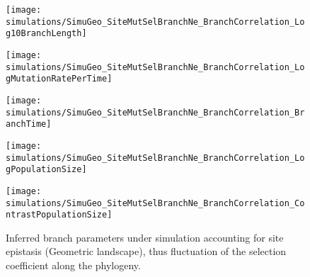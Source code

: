 \begin{figure}[H]
    \centering
    \begin{minipage}{0.32\linewidth}
        \texttt{[image: simulations/SimuGeo\_SiteMutSelBranchNe\_BranchCorrelation\_Log10BranchLength]}
    \end{minipage} \hfill
    \begin{minipage}{0.32\linewidth}
        \texttt{[image: simulations/SimuGeo\_SiteMutSelBranchNe\_BranchCorrelation\_LogMutationRatePerTime]}
    \end{minipage} \hfill
    \begin{minipage}{0.32\linewidth}
        \texttt{[image: simulations/SimuGeo\_SiteMutSelBranchNe\_BranchCorrelation\_BranchTime]}
    \end{minipage} \hfill
    \begin{minipage}{0.32\linewidth}
        \texttt{[image: simulations/SimuGeo\_SiteMutSelBranchNe\_BranchCorrelation\_LogPopulationSize]}
    \end{minipage}
    \begin{minipage}{0.32\linewidth}
        \texttt{[image: simulations/SimuGeo\_SiteMutSelBranchNe\_BranchCorrelation\_ContrastPopulationSize]}
    \end{minipage} \hfill
    \caption[Inferred branch parameters for SimuGeo]{
    Inferred branch parameters under simulation accounting for site epistasis (Geometric landscape), thus fluctuation of the selection coefficient along the phylogeny.
    }
\end{figure}


\begin{table}[H]
    \centering
    \noindent{}
    \caption[Entropy of amino-acids for SimuGeo]{
    Estimated amino-acids entropy under under simulation accounting for site epistasis (Geometric landscape), thus fluctuation of the selection coefficient along the phylogeny.
    Obtained with the inference model of site selection for amino-acid, and branch fluctuation of $\Ne$ (left column), or under the assumption of constant $\Ne$ (right column)}
\end{table}

